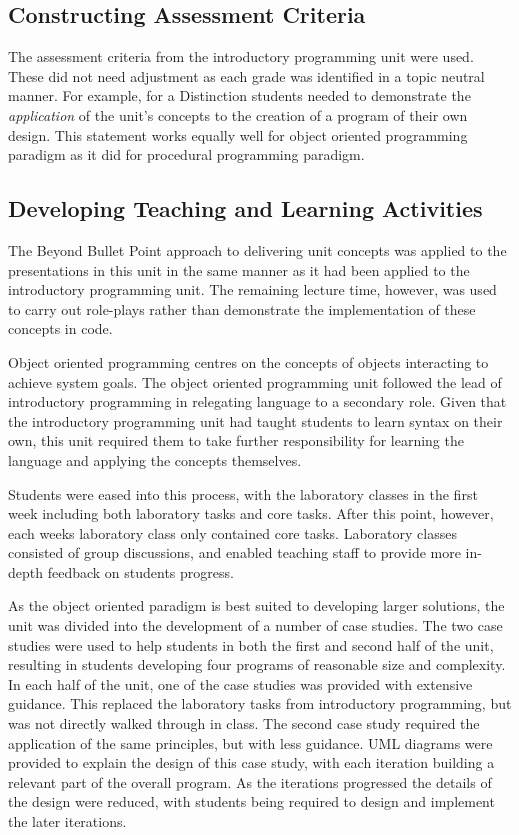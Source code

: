 \subsection{Constructing Assessment Criteria} %
\label{sub:oop_constructing_assessment_criteria}

The assessment criteria from the introductory programming unit were used. These did not need adjustment as each grade was identified in a topic neutral manner. For example, for a Distinction students needed to demonstrate the \emph{application} of the unit's concepts to the creation of a program of their own design. This statement works equally well for object oriented programming paradigm as it did for procedural programming paradigm.


\subsection{Developing Teaching and Learning Activities} %
\label{sub:oop_developing_teaching_and_learning_activities}

The Beyond Bullet Point approach to delivering unit concepts was applied to the presentations in this unit in the same manner as it had been applied to the introductory programming unit. The remaining lecture time, however, was used to carry out role-plays rather than demonstrate the implementation of these concepts in code.

Object oriented programming centres on the concepts of objects interacting to achieve system goals. The object oriented programming unit followed the lead of introductory programming in relegating language to a secondary role. Given that the introductory programming unit had taught students to learn syntax on their own, this unit required them to take further responsibility for learning the language and applying the concepts themselves.

Students were eased into this process, with the laboratory classes in the first week including both laboratory tasks and core tasks. After this point, however, each weeks laboratory class only contained core tasks. Laboratory classes consisted of group discussions, and enabled teaching staff to provide more in-depth feedback on students progress.

As the object oriented paradigm is best suited to developing larger solutions, the unit was divided into the development of a number of case studies. The two case studies were used to help students in both the first and second half of the unit, resulting in students developing four programs of reasonable size and complexity. In each half of the unit, one of the case studies was provided with extensive guidance. This replaced the laboratory tasks from introductory programming, but was not directly walked through in class. The second case study required the application of the same principles, but with less guidance. UML diagrams were provided to explain the design of this case study, with each iteration building a relevant part of the overall program. As the iterations progressed the details of the design were reduced, with students being required to design and implement the later iterations.

